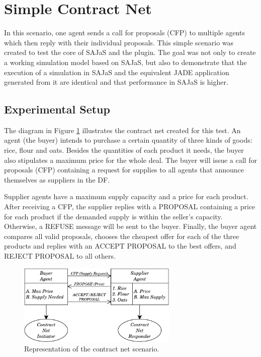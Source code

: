 \section{Simple Contract Net}

In this scenario, one agent sends a call for proposals (CFP) to multiple agents which then reply with their individual proposals. This simple scenario was created to test the core of SAJaS and the plugin. The goal was not only to create a working simulation model based on SAJaS, but also to demonstrate that the execution of a simulation in SAJaS and the equivalent JADE application generated from it are identical and that performance in SAJaS is higher.

\subsection{Experimental Setup}

The diagram in Figure \ref{fig:CNetExample} illustrates the contract net created for this test. An agent (the buyer) intends to purchase a certain quantity of three kinds of goods: rice, flour and oats. Besides the quantities of each product it needs, the buyer also stipulates a maximum price for the whole deal. The buyer will issue a call for proposals (CFP) containing a request for supplies to all agents that announce themselves as suppliers in the DF.

Supplier agents have a maximum supply capacity and a price for each product. After receiving a CFP, the supplier replies with a PROPOSAL containing a price for each product if the demanded supply is within the seller's capacity. Otherwise, a REFUSE message will be sent to the buyer.
Finally, the buyer agent compares all valid proposals, chooses the cheapest offer for each of the three products and replies with an ACCEPT PROPOSAL to the best offers, and REJECT PROPOSAL to all others.

\begin{figure}
	\centering
	\includegraphics[width=3.0in]{figures/CNetExample.pdf}
	\caption{Representation of the contract net scenario.}
	\label{fig:CNetExample}
\end{figure}

